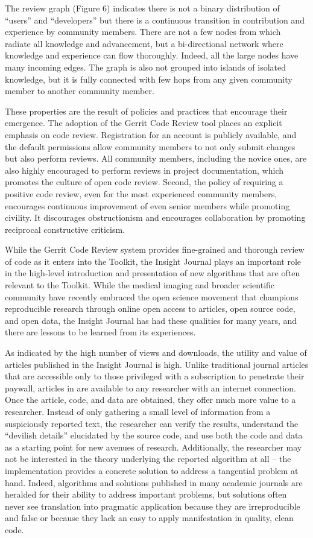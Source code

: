 \documentclass{frontiersENG} %
\begin{document}
The review graph (Figure 6) indicates there is not a binary distribution of
``users'' and ``developers'' but there is a continuous transition in
contribution and experience by community members. There are not a few nodes
from which radiate all knowledge and advancement, but a bi-directional network
where knowledge and experience can flow thoroughly.  Indeed, all the large
nodes have many incoming edges. The graph is also not grouped into islands of
isolated knowledge, but it is fully connected with few hops from any given
community member to another community member.

These properties are the result of policies and practices that encourage their
emergence. The adoption of the Gerrit Code Review tool places an
explicit emphasis on code review.  Registration for an account is publicly
available, and the default permissions allow community members to not only
submit changes but also perform reviews. All community members, including the
novice ones, are also highly encouraged to perform reviews in project
documentation, which promotes the culture of open code review. Second, the
policy of requiring a positive code review, even for the most experienced
community members, encourages continuous improvement of even senior members
while promoting civility. It discourages obstructionism and encourages
collaboration by promoting reciprocal constructive criticism.

While the Gerrit Code Review system provides fine-grained and thorough review
of code as it enters into the Toolkit, the Insight Journal plays an important
role in the high-level introduction and presentation of new algorithms that
are often relevant to the Toolkit. While the medical imaging and broader
scientific community have recently embraced the open science movement that
champions reproducible research through online open access to articles, open
source code, and open data, the Insight Journal has had these qualities for
many years, and there are lessons to be learned from its experiences.

As indicated by the high number of views and downloads, the utility and value of
articles published in the Insight Journal is high.  Unlike traditional
journal articles that are accessible only to those privileged with a
subscription to penetrate their paywall, articles in are available to any
researcher with an internet connection. Once the article, code, and data are
obtained, they offer much more value to a researcher. Instead of only gathering
a small level of information from a suspiciously reported text, the researcher
can verify the results, understand the ``devilish details'' elucidated by the
source code, and use both the code and data as a starting point for new avenues
of research. Additionally, the researcher may not be interested in the theory
underlying the reported algorithm at all -- the implementation provides a
concrete solution to address a tangential problem at hand. Indeed, algorithms
and solutions published in many academic journals are heralded for their
ability to address important problems, but solutions often never see
translation into pragmatic application because they are irreproducible and
false or because they lack an easy to apply manifestation in quality, clean code.
\end{document}
